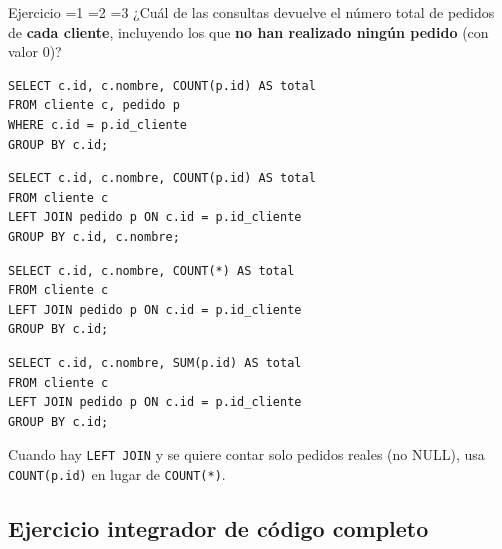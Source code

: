 \documentclass[12pt, a4paper]{article}
\newcommand{\estrella}{{\color{Goldenrod}\faStarSolid}}
\newcommand{\estrellavacia}{{\color{gray!45}\faStarSolid}}
\newcommand{\nivel}[1]{%
  \ifnum#1=1\estrella\estrellavacia\estrellavacia\fi
  \ifnum#1=2\estrella\estrella\estrellavacia\fi
  \ifnum#1=3\estrella\estrella\estrella\fi
}
\newcounter{numej}
\newcommand{\ej}{\stepcounter{numej}\thenumej}
\begin{document}
\begin{ejercicio}{Ejercicio \ej}{\nivel{3}}
¿Cuál de las consultas devuelve el número total de pedidos
de \textbf{cada cliente}, incluyendo los que \textbf{no han realizado
ningún pedido} (con valor 0)?

\begin{opciones}
  \item
\begin{lstlisting}
SELECT c.id, c.nombre, COUNT(p.id) AS total
FROM cliente c, pedido p
WHERE c.id = p.id_cliente
GROUP BY c.id;
\end{lstlisting}
  \item
\begin{lstlisting}
SELECT c.id, c.nombre, COUNT(p.id) AS total
FROM cliente c
LEFT JOIN pedido p ON c.id = p.id_cliente
GROUP BY c.id, c.nombre;
\end{lstlisting}
  \item
\begin{lstlisting}
SELECT c.id, c.nombre, COUNT(*) AS total
FROM cliente c
LEFT JOIN pedido p ON c.id = p.id_cliente
GROUP BY c.id;
\end{lstlisting}
  \item
\begin{lstlisting}
SELECT c.id, c.nombre, SUM(p.id) AS total
FROM cliente c
LEFT JOIN pedido p ON c.id = p.id_cliente
GROUP BY c.id;
\end{lstlisting}
\end{opciones}

\begin{hint}
Cuando hay \texttt{LEFT JOIN} y se quiere contar solo pedidos
reales (no NULL), usa \texttt{COUNT(p.id)} en lugar de
\texttt{COUNT(*)}.
\end{hint}
\end{ejercicio}

\subsection{Ejercicio integrador de código completo}
\end{document}
